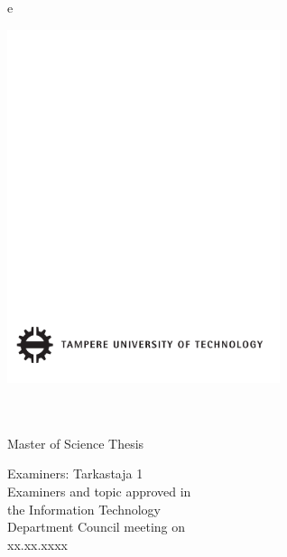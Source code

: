 e 
\thispagestyle{empty}
 
\vspace*{-.5cm}\noindent
 
 
\includegraphics[width=8cm]{assets/tut-logo}
 
\vspace{6.8cm}
 
\\
{\bf\large \textsf{}}\\
\textsf{Master of Science Thesis}
 
\vspace{8.7cm} %
 
\begin{flushright}
  
\begin{minipage}[c]{6.8cm}
\begin{spacing}{1.0}
\textsf{Examiners: Tarkastaja 1}\\
\textsf{Examiners and topic approved in}\\ 
\textsf{the Information Technology}\\
\textsf{Department Council meeting on}\\
\textsf{xx.xx.xxxx}\\
\end{spacing}
\end{minipage}
\end{flushright}
 
